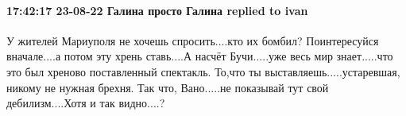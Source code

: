  
 
 
 
 

\paragraph{17:42:17 23-08-22 Галина просто Галина replied to ivan}

У жителей Мариуполя не хочешь спросить....кто их бомбил? Поинтересуйся
вначале....а потом эту хрень ставь....А насчёт Бучи.....уже весь мир
знает.....что это был хреново поставленный спектакль. То,что ты
выставляешь.....устаревшая, никому не нужная брехня. Так что, Вано.....не
показывай тут свой дебилизм....Хотя и так видно....?
